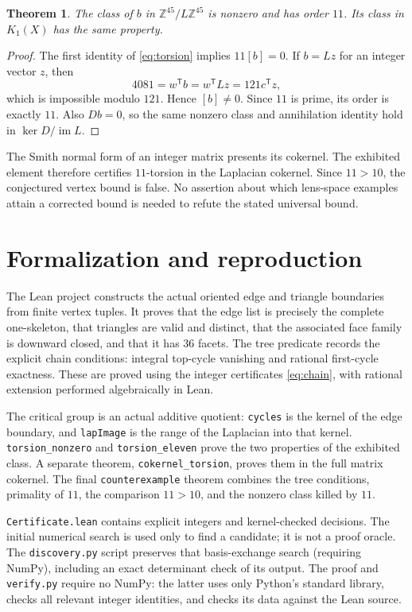 \documentclass[11pt]{article}
\newtheorem{theorem}{Theorem}
\newcommand{\Z}{\mathbb Z}\newcommand{\Q}{\mathbb Q}
\begin{document}
\begin{theorem}
The class of $b$ in $\Z^{45}/L\Z^{45}$ is nonzero and has order $11$.
Its class in $K_1(X)$ has the same property.
\end{theorem}
\begin{proof}
The first identity of \eqref{eq:torsion} implies $11[b]=0$.
If $b=Lz$ for an integer vector $z$, then
\[
 4081=w^{\mathsf T}b=w^{\mathsf T}Lz=121c^{\mathsf T}z,
\]
which is impossible modulo $121$. Hence $[b]\ne0$. Since $11$ is
prime, its order is exactly $11$. Also $Db=0$, so the same
nonzero class and annihilation identity hold in
$\ker D/\operatorname{im}L$.
\end{proof}
The Smith normal form of an integer matrix presents its cokernel.
The exhibited element therefore certifies $11$-torsion in the
Laplacian cokernel. Since $11>10$, the conjectured vertex bound is
false. No assertion about which lens-space examples attain a
corrected bound is needed to refute the stated universal bound.

\newpage
\section*{Formalization and reproduction}
The Lean project constructs the actual oriented edge and triangle
boundaries from finite vertex tuples. It proves that the edge list
is precisely the complete one-skeleton, that triangles are valid
and distinct, that the associated face family is downward closed,
and that it has $36$ facets. The tree predicate records the
explicit chain conditions: integral top-cycle vanishing and
rational first-cycle exactness. These are proved using the
integer certificates \eqref{eq:chain}, with rational extension
performed algebraically in Lean.

The critical group is an actual additive quotient:
\texttt{cycles} is the kernel of the edge boundary, and
\texttt{lapImage} is the range of the Laplacian into that kernel.
\texttt{torsion\_nonzero} and \texttt{torsion\_eleven} prove the
two properties of the exhibited class. A separate theorem,
\texttt{cokernel\_torsion}, proves them in the full matrix cokernel.
The final \texttt{counterexample} theorem combines the tree
conditions, primality of $11$, the comparison $11>10$, and the
nonzero class killed by $11$.

\texttt{Certificate.lean} contains explicit integers and
kernel-checked decisions. The initial numerical search is used
only to find a candidate; it is not a proof oracle. The
\texttt{discovery.py} script preserves that basis-exchange search
(requiring NumPy), including an exact determinant check of its
output. The proof and \texttt{verify.py} require no NumPy:
the latter uses only Python's standard library, checks all relevant
integer identities, and checks its data against the Lean source.
\end{document}
